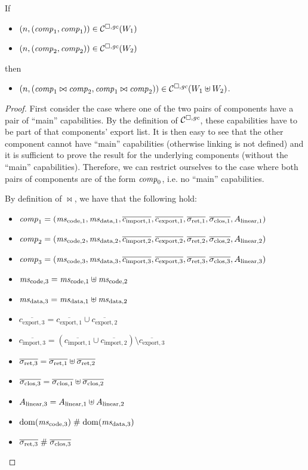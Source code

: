 \documentclass[a4paper]{article}
\begin{document}
\begin{lemma}
  \label{lem:compat-linking}
  If
  \begin{itemize}
  \item $\left(n,(\mathit{comp}_1,\mathit{comp}_1)\right) \in \mathcal{C}^{\square,\mathit{gc}}(W_1)$
  \item $\left(n,(\mathit{comp}_2,\mathit{comp}_2)\right) \in \mathcal{C}^{\square,\mathit{gc}}(W_2)$
  \end{itemize}
  then
  \begin{itemize}
  \item $\left(n,(\mathit{comp}_1 \bowtie \mathit{comp}_2,\mathit{comp}_1\bowtie\mathit{comp}_2)\right) \in \mathcal{C}^{\square,\mathit{gc}}(W_1 \uplus W_2)$.
  \end{itemize}
\end{lemma}
\begin{proof}
  First consider the case where one of the two pairs of components have a pair of ``main'' capabilities.
  By the definition of $\mathcal{C}^{\square,\mathit{gc}}$, these capabilities have to be part of that components' export list.
  It is then easy to see that the other component cannot have ``main'' capabilities (otherwise linking is not defined) and it is sufficient to prove the result for the underlying components (without the ``main'' capabilities).
  Therefore, we can restrict ourselves to the case where both pairs of components are of the form $\mathit{comp}_0$, i.e. no ``main'' capabilities.

  By definition of $\bowtie$, we have that the following hold:
  \begin{itemize}
  \item $\var{comp}_1 = (\mscode[1], \msdata[1], \overline{c_{\mathrm{import},1}}, \overline{c_{\mathrm{export},1}}, \sigrets[1], \sigcloss[1],A_{\linear,1})$
  \item $\var{comp}_2 = (\mscode[2], \msdata[2], \overline{c_{\mathrm{import},2}}, \overline{c_{\mathrm{export},2}}, \sigrets[2], \sigcloss[2],A_{\linear,2})$
  \item $\var{comp}_3 = (\mscode[3], \msdata[3], \overline{c_{\mathrm{import},3}}, \overline{c_{\mathrm{export},3}}, \sigrets[3], \sigcloss[3],A_{\linear,3})$
  \item $\mscode[3] = \mscode[1] \uplus \mscode[2]$
  \item $\msdata[3] = \msdata[1] \uplus \msdata[2]$
  \item $\overline{c_{\mathrm{export},3}} = \overline{c_{\mathrm{export},1}} \cup \overline{c_{\mathrm{export},2}}$
  \item $\overline{c_{\mathrm{import},3}} = (\overline{c_{\mathrm{import},1}} \cup \overline{c_{\mathrm{import},2}}) \setminus \overline{c_{\mathrm{export},3}}$
  \item $\sigrets[3] = \sigrets[1] \uplus \sigrets[2]$
  \item $\sigcloss[3] = \sigcloss[1] \uplus \sigcloss[2]$
  \item $A_{\mathrm{linear},3} = A_{\mathrm{linear},1} \uplus A_{\mathrm{linear},2}$
  \item $\dom(\mscode[3]) \mathrel{\#} \dom(\msdata[3])$
  \item $\sigrets[3] \mathrel{\#} \sigcloss[3]$
  \end{itemize}


\end{proof}
\end{document}
